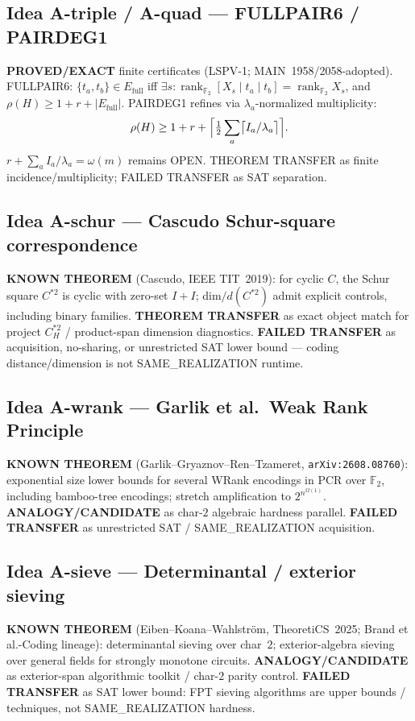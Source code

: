 \documentclass[11pt]{article}
\begin{document}
\subsection*{Idea A-triple / A-quad --- FULLPAIR6 / PAIRDEG1}
\textbf{PROVED/EXACT} finite certificates (LSPV-1; MAIN~1958/2058-adopted).
FULLPAIR6: $\{t_a,t_b\}\in E_{\mathrm{full}}$ iff $\exists s:
\operatorname{rank}_{\mathbb F_2}[X_s\mid t_a\mid t_b]=\operatorname{rank}_{\mathbb F_2}X_s$,
and $\rho(H)\ge 1+r+|E_{\mathrm{full}}|$. PAIRDEG1 refines via
$\lambda_a$-normalized multiplicity:
\[
\rho(H)\ge 1+r+\Bigl\lceil\tfrac12\sum_a\bigl\lceil I_a/\lambda_a\bigr\rceil\Bigr\rceil.
\]
$r+\sum_a I_a/\lambda_a=\omega(m)$ remains OPEN. THEOREM TRANSFER as finite
incidence/multiplicity; FAILED TRANSFER as SAT separation.

\subsection*{Idea A-schur --- Cascudo Schur-square correspondence}
\textbf{KNOWN THEOREM} (Cascudo, IEEE TIT~2019): for cyclic $C$, the Schur square
$C^{*2}$ is cyclic with zero-set $I+I$; dim$/d(C^{*2})$ admit explicit controls,
including binary families. \textbf{THEOREM TRANSFER} as exact object match for
project $C_H^{*2}$ / product-span dimension diagnostics.
\textbf{FAILED TRANSFER} as acquisition, no-sharing, or unrestricted SAT lower
bound --- coding distance/dimension is not SAME\_REALIZATION runtime.

\subsection*{Idea A-wrank --- Garlik et al.\ Weak Rank Principle}
\textbf{KNOWN THEOREM} (Garlik--Gryaznov--Ren--Tzameret, \texttt{arXiv:2608.08760}):
exponential size lower bounds for several WRank encodings in PCR over
$\mathbb F_2$, including bamboo-tree encodings; stretch amplification to
$2^{n^{\Omega(1)}}$.
\textbf{ANALOGY/CANDIDATE} as char-$2$ algebraic hardness parallel.
\textbf{FAILED TRANSFER} as unrestricted SAT / SAME\_REALIZATION acquisition.

\subsection*{Idea A-sieve --- Determinantal / exterior sieving}
\textbf{KNOWN THEOREM} (Eiben--Koana--Wahlstr\"om, TheoretiCS~2025; Brand et al.\nExtensor-Coding lineage): determinantal sieving over char~$2$; exterior-algebra
sieving over general fields for strongly monotone circuits.
\textbf{ANALOGY/CANDIDATE} as exterior-span algorithmic toolkit / char-$2$
parity control.
\textbf{FAILED TRANSFER} as SAT lower bound: FPT sieving algorithms are upper
bounds / techniques, not SAME\_REALIZATION hardness.
\end{document}
